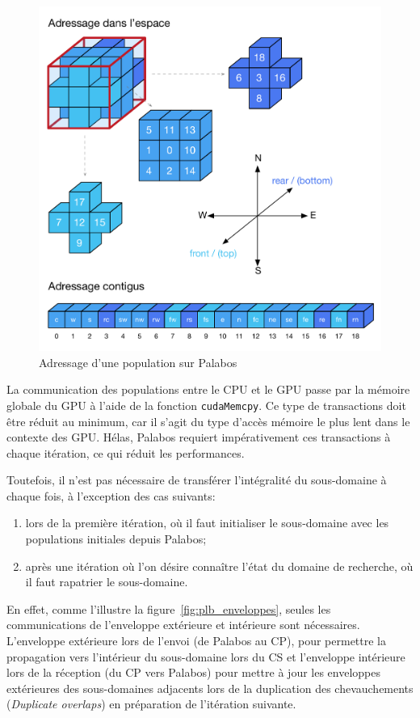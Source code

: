 \begin{figure}[h]
	\centering
	\includegraphics[scale=0.85, fbox]{images/index_population_palabos.pdf}
	\caption{Adressage d'une population sur Palabos}
	\label{fig:plb_population_index}
\end{figure}

La communication des populations entre le \acs{CPU} et le \acs{GPU} passe par la mémoire globale du \acs{GPU} à l'aide de la fonction \texttt{cudaMemcpy}. Ce type de transactions doit être réduit au minimum, car il s'agit du type d'accès mémoire le plus lent dans le contexte des \acs{GPU}. Hélas, Palabos requiert impérativement ces transactions à chaque itération, ce qui réduit les performances.

Toutefois, il n'est pas nécessaire de transférer l'intégralité du sous-domaine à chaque fois, à l'exception des cas suivants:
\begin{enumerate}
\item lors de la première itération, où il faut initialiser le sous-domaine avec les populations initiales depuis Palabos;
\item après une itération où l'on désire connaître l'état du domaine de recherche, où il faut rapatrier le sous-domaine.
\end{enumerate}

En effet, comme l'illustre la figure~\ref{fig:plb_enveloppes}, seules les communications de l'enveloppe extérieure et intérieure sont nécessaires.
L'enveloppe extérieure lors de l'envoi (de Palabos au \ac{CP}), pour permettre la propagation vers l'intérieur du sous-domaine lors du \ac{CS} et l'enveloppe intérieure lors de la réception (du \ac{CP} vers Palabos) pour mettre à jour les enveloppes extérieures des sous-domaines adjacents lors de la duplication des chevauchements (\textit{Duplicate overlaps}) en préparation de l'itération suivante. 

